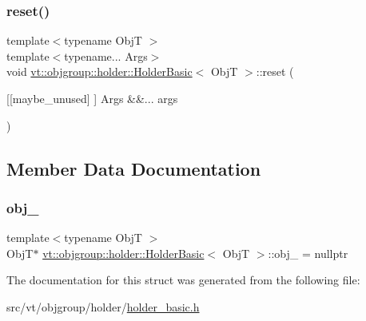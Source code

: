\subsubsection{\texorpdfstring{reset()}{reset()}}
{\footnotesize\ttfamily template$<$typename ObjT $>$ \\
template$<$typename... Args$>$ \\
void \hyperlink{structvt_1_1objgroup_1_1holder_1_1_holder_basic}{vt\+::objgroup\+::holder\+::\+Holder\+Basic}$<$ ObjT $>$\+::reset (\begin{DoxyParamCaption}\item[{\mbox{[}\mbox{[}maybe\+\_\+unused\mbox{]} \mbox{]} Args \&\&...}]{args }\end{DoxyParamCaption})\hspace{0.3cm}{\ttfamily [inline]}}



\subsection{Member Data Documentation}
\mbox{\label{structvt_1_1objgroup_1_1holder_1_1_holder_basic_a2313dfbdc994c52b649ee2fc666f1219}} 
\subsubsection{\texorpdfstring{obj\+\_\+}{obj\_}}
{\footnotesize\ttfamily template$<$typename ObjT $>$ \\
ObjT$\ast$ \hyperlink{structvt_1_1objgroup_1_1holder_1_1_holder_basic}{vt\+::objgroup\+::holder\+::\+Holder\+Basic}$<$ ObjT $>$\+::obj\+\_\+ = nullptr\hspace{0.3cm}{\ttfamily [private]}}



The documentation for this struct was generated from the following file\+:\begin{DoxyCompactItemize}
\item 
src/vt/objgroup/holder/\hyperlink{holder__basic_8h}{holder\+\_\+basic.\+h}\end{DoxyCompactItemize}
